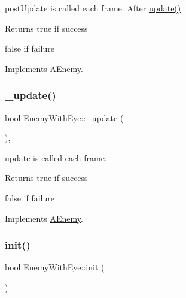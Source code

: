 post\+Update is called each frame. After \hyperlink{class_a_enemy_a01e3b0313d6f29bf2cafe20f711c0550}{update()} 

\begin{DoxyReturn}{Returns}
true if success 

false if failure 
\end{DoxyReturn}


Implements \hyperlink{class_a_enemy_a78b010638f552c4ab11ff71e7b826b1b}{A\+Enemy}.

\mbox{\label{class_enemy_with_eye_a3dff148a3aed8d67434111fd052f71c2}} 
\subsubsection{\texorpdfstring{\+\_\+update()}{\_update()}}
{\footnotesize\ttfamily bool Enemy\+With\+Eye\+::\+\_\+update (\begin{DoxyParamCaption}{ }\end{DoxyParamCaption})\hspace{0.3cm}{\ttfamily [protected]}, {\ttfamily [virtual]}}



update is called each frame. 

\begin{DoxyReturn}{Returns}
true if success 

false if failure 
\end{DoxyReturn}


Implements \hyperlink{class_a_enemy_abefc22131eb1c618819c67c3c1415c08}{A\+Enemy}.

\mbox{\label{class_enemy_with_eye_afe1006e6d3cdba1365bbc29fcc9f71b0}} 
\subsubsection{\texorpdfstring{init()}{init()}}
{\footnotesize\ttfamily bool Enemy\+With\+Eye\+::init (\begin{DoxyParamCaption}{ }\end{DoxyParamCaption})\hspace{0.3cm}{\ttfamily [virtual]}}



